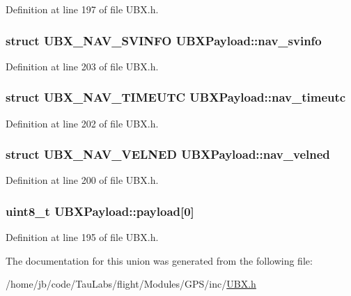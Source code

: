 \-Definition at line 197 of file \-U\-B\-X.\-h.

\hypertarget{union_u_b_x_payload_ae82725b3f4df8d06429de80876bd7bb4}{
\subsubsection[{nav\-\_\-svinfo}]{\setlength{\rightskip}{0pt plus 5cm}struct {\bf \-U\-B\-X\-\_\-\-N\-A\-V\-\_\-\-S\-V\-I\-N\-F\-O} {\bf \-U\-B\-X\-Payload\-::nav\-\_\-svinfo}}}\label{union_u_b_x_payload_ae82725b3f4df8d06429de80876bd7bb4}


\-Definition at line 203 of file \-U\-B\-X.\-h.

\hypertarget{union_u_b_x_payload_af65229991956493628326aa718c2e156}{
\subsubsection[{nav\-\_\-timeutc}]{\setlength{\rightskip}{0pt plus 5cm}struct {\bf \-U\-B\-X\-\_\-\-N\-A\-V\-\_\-\-T\-I\-M\-E\-U\-T\-C} {\bf \-U\-B\-X\-Payload\-::nav\-\_\-timeutc}}}\label{union_u_b_x_payload_af65229991956493628326aa718c2e156}


\-Definition at line 202 of file \-U\-B\-X.\-h.

\hypertarget{union_u_b_x_payload_ae525d323fa4053d1f5441bae99d81a95}{
\subsubsection[{nav\-\_\-velned}]{\setlength{\rightskip}{0pt plus 5cm}struct {\bf \-U\-B\-X\-\_\-\-N\-A\-V\-\_\-\-V\-E\-L\-N\-E\-D} {\bf \-U\-B\-X\-Payload\-::nav\-\_\-velned}}}\label{union_u_b_x_payload_ae525d323fa4053d1f5441bae99d81a95}


\-Definition at line 200 of file \-U\-B\-X.\-h.

\hypertarget{union_u_b_x_payload_a1aaa9f05bb8d9cec08462c71aedeb224}{
\subsubsection[{payload}]{\setlength{\rightskip}{0pt plus 5cm}uint8\-\_\-t {\bf \-U\-B\-X\-Payload\-::payload}\mbox{[}0\mbox{]}}}\label{union_u_b_x_payload_a1aaa9f05bb8d9cec08462c71aedeb224}


\-Definition at line 195 of file \-U\-B\-X.\-h.



\-The documentation for this union was generated from the following file\-:\begin{DoxyCompactItemize}
\item 
/home/jb/code/\-Tau\-Labs/flight/\-Modules/\-G\-P\-S/inc/\hyperlink{_u_b_x_8h}{\-U\-B\-X.\-h}\end{DoxyCompactItemize}
